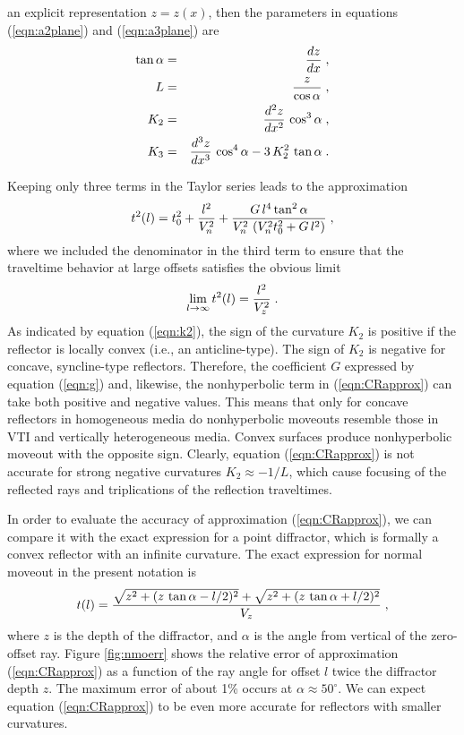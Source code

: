an explicit representation $z=z(x)$, then the parameters in equations
(\ref{eqn:a2plane}) and (\ref{eqn:a3plane}) are
\begin{eqnarray}
\tan{\alpha} & = & {{d z} \over {d x}}\;,
\label{eqn:dip} \\
L & = & {z \over {\cos{\alpha}}}\;,
\label{eqn:l} \\
K_2 & = & {{d^2 z} \over {d x^2}}\,\cos^3{\alpha}\;,
\label{eqn:k2} \\
K_3 & = & {{d^3 z} \over {d x^3}}\,\cos^4{\alpha} - 
3\,K_2^2\,\tan{\alpha}\;.
\label{eqn:k3}
\end{eqnarray}
\par
Keeping only three terms in the Taylor series leads to the approximation
\begin{equation}
t^2(l) = t_0^2 + {l^2 \over V_n^2} + {{G\,l^4 \tan^2{\alpha}} \over 
{V_n^2\,\left(V_n^2 t_0^2 + G\,l^2\right)}}\;,
\label{eqn:CRapprox}
\end{equation}
where we included the denominator in the third term to ensure that the
traveltime behavior at large offsets satisfies the obvious limit
\begin{equation}
\lim_{l \rightarrow \infty} t^2(l) = {l^2 \over V_z^2}\;.
\label{eqn:CRlimit}
\end{equation}
As indicated by equation (\ref{eqn:k2}), the sign of the curvature $K_2$ is
positive if the reflector is locally convex (i.e., an anticline-type). 
The sign of $K_2$ is negative for concave, syncline-type reflectors. 
Therefore, the coefficient $G$
expressed by equation (\ref{eqn:g}) and, likewise, the nonhyperbolic term in
(\ref{eqn:CRapprox}) can take both positive and negative values. This means
that only for concave reflectors in homogeneous media do nonhyperbolic
moveouts resemble those in VTI and vertically heterogeneous media.
Convex surfaces produce nonhyperbolic moveout with the opposite sign.
Clearly, equation (\ref{eqn:CRapprox}) is not accurate for strong
negative curvatures $K_2 \approx -1 / L$, 
which cause focusing of the
reflected rays and triplications of the reflection traveltimes.
\par
In order to evaluate the accuracy of approximation (\ref{eqn:CRapprox}), we
can compare it with the exact expression for a point diffractor, which 
is formally a convex reflector with an
infinite curvature. The exact expression for normal moveout 
in the present notation is
\begin{equation}
t(l) = {{\sqrt{z^2 + {(z\,\tan{\alpha} - l/2)^2}} +
\sqrt{z^2 + {(z\,\tan{\alpha} + l/2)^2}}} \over {V_z}}\;,
\label{eqn:ttdiff}
\end{equation}
where $z$ is the depth of the diffractor, and $\alpha$ is the angle from 
vertical of the
zero-offset ray. Figure \ref{fig:nmoerr} shows the relative error of
approximation (\ref{eqn:CRapprox}) as a function of the ray angle for
offset $l$ twice the diffractor depth $z$. The
maximum error of about 1\% occurs at $\alpha \approx 50^{\circ}$.
We can expect equation (\ref{eqn:CRapprox}) to be even more accurate
for reflectors with smaller curvatures.

